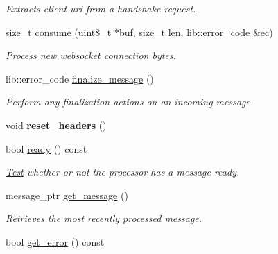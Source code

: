 \begin{DoxyCompactItemize}
\begin{DoxyCompactList}\small\item\em Extracts client uri from a handshake request. \end{DoxyCompactList}\item 
size\+\_\+t \mbox{\hyperlink{classwebsocketpp_1_1processor_1_1hybi13_a5c5e3234a0067c7f14fe0ceb4e647659}{consume}} (uint8\+\_\+t $\ast$buf, size\+\_\+t len, lib\+::error\+\_\+code \&ec)
\begin{DoxyCompactList}\small\item\em Process new websocket connection bytes. \end{DoxyCompactList}\item 
lib\+::error\+\_\+code \mbox{\hyperlink{classwebsocketpp_1_1processor_1_1hybi13_a906398e2c23370de53d4f3572657ad05}{finalize\+\_\+message}} ()
\begin{DoxyCompactList}\small\item\em Perform any finalization actions on an incoming message. \end{DoxyCompactList}\item 
\mbox{\label{classwebsocketpp_1_1processor_1_1hybi13_a052dd867709539c0a3f70eb271da70ca}} 
void {\bfseries reset\+\_\+headers} ()
\item 
\mbox{\label{classwebsocketpp_1_1processor_1_1hybi13_af0e73b14cac728a873c8b5c0bc82ed03}} 
bool \mbox{\hyperlink{classwebsocketpp_1_1processor_1_1hybi13_af0e73b14cac728a873c8b5c0bc82ed03}{ready}} () const
\begin{DoxyCompactList}\small\item\em \mbox{\hyperlink{struct_test}{Test}} whether or not the processor has a message ready. \end{DoxyCompactList}\item 
message\+\_\+ptr \mbox{\hyperlink{classwebsocketpp_1_1processor_1_1hybi13_a8fe09bba8cbe2821ef5c7cf3fd9573cd}{get\+\_\+message}} ()
\begin{DoxyCompactList}\small\item\em Retrieves the most recently processed message. \end{DoxyCompactList}\item 
\mbox{\label{classwebsocketpp_1_1processor_1_1hybi13_a6f95f4d45deb00fab39d1fe4441256be}} 
bool \mbox{\hyperlink{classwebsocketpp_1_1processor_1_1hybi13_a6f95f4d45deb00fab39d1fe4441256be}{get\+\_\+error}} () const

\end{DoxyCompactItemize}
